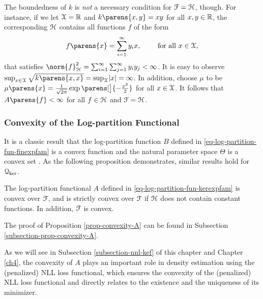 The boundedness of $k$ is \emph{not} a necessary condition for $\mathcal{F} = \mathcal{H}$, though. For instance, if we let $\mathcal{X} = \mathbb{R}$ and $k \parens{x, y} = x y$ for all $x, y \in \mathbb{R}$, the corresponding $\mathcal{H}$ contains all functions $f$ of the form 
\begin{align*}
	f \parens{x} = \sum_{i=1}^{\infty} y_i x, \qquad \text{ for all } x \in \calX, 
\end{align*}
that satisfies $\norm{f}_{\calH}^2 = \sum_{i=1}^{\infty} \sum_{j=1}^{\infty} y_i y_j < \infty$. It is easy to observe $\sup_{x \in \calX} \sqrt{k \parens{x, x} } = \sup_{\calX} \abs{x} = \infty$. In addition, choose $\mu$ to be $\mu \parens{x} = \frac{1}{\sqrt{2 \pi}} \exp \parens[\big]{-\frac{x^2}{2}}$ for all $x \in \mathcal{X}$. It follows that $A \parens{f} < \infty$ for all $f \in \mathcal{H}$ and $\mathcal{F} = \mathcal{H}$. 

\subsubsection{Convexity of the Log-partition Functional}

It is a classic result that the log-partition function $B$ defined in \eqref{eq-log-partition-fun-finexpfam} is a convex function and the natural parameter space $\Theta$ is a convex set \parencites[Theorem 7.1 in][]{Barndorff-Nielsen2014-ua}. As the following proposition demonstrates, similar results hold for $\mathcal{Q}_{\ker}$. 

\begin{proposition}\label{prop-convexity-A}
	The log-partition functional $A$ defined in \eqref{eq-log-partition-fun-kerexpfam} is convex over $\mathcal{F}$, and is strictly convex over $\mathcal{F}$ if $\mathcal{H}$ does $\mathrm{not}$ contain constant functions. In addition, $\mathcal{F}$ is convex. 
\end{proposition}

The proof of Proposition \ref{prop-convexity-A} can be found in Subsection \ref{subsection-prop-convexity-A}. 

As we will see in Subsection \ref{subsection-nnl-kef} of this chapter and Chapter \ref{ch4}, the convexity of $A$ plays an important role in density estimation using the (penalized) NLL loss functional, which ensures the convexity of the (penalized) NLL loss functional and directly relates to the existence and the uniqueness of its minimizer. 

